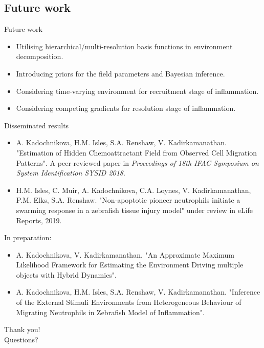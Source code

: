 \documentclass[mathserif,11pt]{beamer}
\begin{document}
\subsection{Future work}
\begin{frame}{Future work}
\begin{itemize}
	\item Utilising hierarchical/multi-resolution basis functions in environment decomposition.
	\item Introducing priors for the field parameters and Bayesian inference.
	\item Considering time-varying environment for recruitment stage of inflammation.
	\item Considering competing gradients for resolution stage of inflammation.
\end{itemize}
\end{frame}
\begin{frame}{Disseminated results}
\footnotesize{
\begin{itemize}
\item A. Kadochnikova, H.M. Isles, S.A. Renshaw, V. Kadirkamanathan.
"Estimation of Hidden Chemoattractant Field from Observed Cell Migration Patterns". A peer-reviewed paper in \textit{Proceedings of 18th IFAC Symposium on System Identification SYSID 2018}.
\item H.M. Isles, C. Muir, A. Kadochnikova, C.A. Loynes, V. Kadirkamanathan, P.M. Elks, S.A. Renshaw. "Non-apoptotic pioneer neutrophils initiate a swarming response in a zebrafish tissue injury model" under review in eLife Reports, 2019.
\end{itemize} 
In preparation:
\begin{itemize}
	\item A. Kadochnikova, V. Kadirkamanathan.
	"An Approximate Maximum Likelihood Framework for Estimating the Environment Driving multiple objects with Hybrid Dynamics".
	\item A. Kadochnikova, H.M. Isles, S.A. Renshaw, V. Kadirkamanathan. "Inference of the
	External Stimuli Environments from Heterogeneous Behaviour of Migrating Neutrophils in Zebrafish Model of Inflammation".
\end{itemize}
}
\end{frame}
\begin{frame}
\centering
\Huge{Thank you!}\\
\huge{Questions?}
\end{frame}
%
\end{document}
